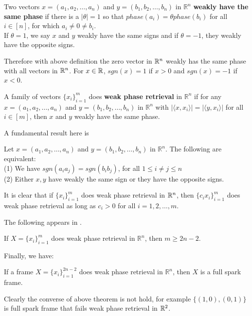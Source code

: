 \begin{definition}\label{D:Weakly have the same phase}
Two vectors  $x=(a_1,a_2,\dots,a_n)$ and $y=(b_1,b_2,\dots,b_n)$ in $\mathbb{R}^n$
{\bf weakly have the same phase} if there is a $|\theta|=1$ so that
$phase(a_i)=\theta phase(b_i)$ for all $i \in [n]$, for which $a_i \ne 0 \ne b_i$.\\
If $\theta=1$, we say $x$ and $y$ weakly have the same signs and if $\theta=-1$, they weakly have the opposite signs.
\end{definition}
Therefore with above definition the zero vector in $\mathbb R^n$  weakly has the same phase with all vectors in $\mathbb R^n$.
For $x\in \mathbb R$, $sgn(x)=1$ if $x>0$ and $sgn(x)=-1$ if $x<0$.
\begin{definition}\label{D:Weak phase retrieval by vectors}
A family of vectors $\{x_i\}_{i=1}^m$ does {\bf weak phase retrieval} in $\mathbb{R}^n$ if for any $x=(a_1,a_2,\dots,a_n)$ and $y=(b_1,b_2,\dots,b_n)$ in $\mathbb{R}^n$ with $|\langle x,x_i \rangle |=|\langle y,x_i \rangle |$ for all $i \in [m]$, then $x$ and $y$ weakly have the same phase.
\end{definition}
  A fundamental result here is
\begin{proposition}  \label{D:pp}\cite{ACNT2015}
Let $x=(a_1,a_2,\dots,a_n)$ and $y=(b_1,b_2,\dots,b_n)$ in $\mathbb{R}^n$. The following are equivalent:\\
(1) We have $sgn(a_i a_j)=sgn(b_i b_j)$,\: for  all $1 \leq i \ne j \leq n$ \\
(2) Either $x,y$ have weakly the same sign or they have the opposite signs.
\end{proposition}
It is clear that if $\{x_i\}_{i=1}^m$ does weak phase retrieval  in $\mathbb R^n$, then
$\{c_ix_i\}_{i=1}^m$ does  weak phase retrieval as long as $c_i>0$ for all $i=1,2,\ldots,m$.

The following appears in \cite{ACGJT2016}.
\begin{theorem}
If $X=\{x_i\}_{i=1}^m$ does weak phase retrieval in $\mathbb{R}^n$, then $m \geq 2n-2$.
\end{theorem}
Finally, we have:
\begin{theorem}\label{D:fa66}\cite{ACGJT2016}
 If a frame $X=\{x_i\}_{i=1}^{2n-2}$ does weak phase retrieval in $\mathbb{R}^n$, then $X$ is a full spark frame.
\end{theorem}
Clearly the converse of above theorem is not hold, for example $\{(1,0),(0,1)\}$ is full spark frame that fails weak phase retrieval in $\mathbb R^2$.\\

